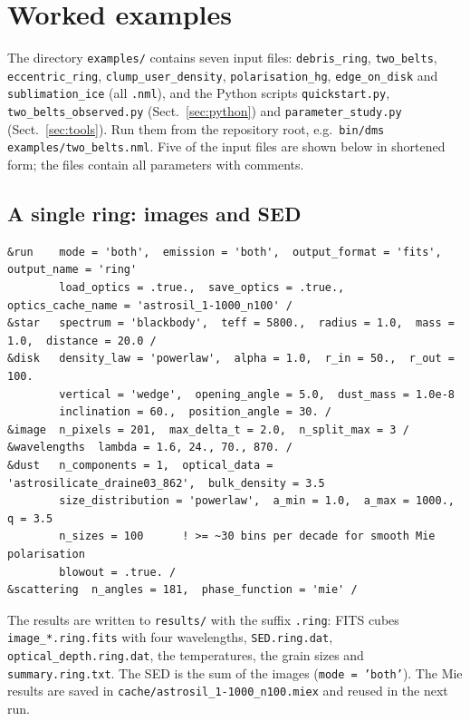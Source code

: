 \documentclass[11pt,a4paper]{article}
\newcommand{\code}[1]{\texttt{#1}}
\begin{document}
\section{Worked examples}
\label{sec:examples}

The directory \code{examples/} contains seven input files: \code{debris\_ring}, \code{two\_belts},
\code{eccentric\_ring}, \code{clump\_user\_density}, \code{polarisation\_hg}, \code{edge\_on\_disk}
and \code{sublimation\_ice} (all \code{.nml}), and the Python scripts \code{quickstart.py},
\code{two\_belts\_observed.py} (Sect.~\ref{sec:python}) and \code{parameter\_study.py}
(Sect.~\ref{sec:tools}). Run them from the repository root, e.g.\
\code{bin/dms examples/two\_belts.nml}. Five of the input files are shown below in shortened form; the files
contain all parameters with comments.

\subsection{A single ring: images and SED}

\begin{lstlisting}[style=nml]
&run    mode = 'both',  emission = 'both',  output_format = 'fits',  output_name = 'ring'
        load_optics = .true.,  save_optics = .true.,  optics_cache_name = 'astrosil_1-1000_n100' /
&star   spectrum = 'blackbody',  teff = 5800.,  radius = 1.0,  mass = 1.0,  distance = 20.0 /
&disk   density_law = 'powerlaw',  alpha = 1.0,  r_in = 50.,  r_out = 100.
        vertical = 'wedge',  opening_angle = 5.0,  dust_mass = 1.0e-8
        inclination = 60.,  position_angle = 30. /
&image  n_pixels = 201,  max_delta_t = 2.0,  n_split_max = 3 /
&wavelengths  lambda = 1.6, 24., 70., 870. /
&dust   n_components = 1,  optical_data = 'astrosilicate_draine03_862',  bulk_density = 3.5
        size_distribution = 'powerlaw',  a_min = 1.0,  a_max = 1000.,  q = 3.5
        n_sizes = 100      ! >= ~30 bins per decade for smooth Mie polarisation
        blowout = .true. /
&scattering  n_angles = 181,  phase_function = 'mie' /
\end{lstlisting}
The results are written to \code{results/} with the suffix \code{.ring}: FITS cubes
\code{image\_*.ring.fits} with four wavelengths, \code{SED.ring.dat}, \code{optical\_depth.ring.dat},
the temperatures, the grain sizes and \code{summary.ring.txt}. The SED is the sum of the images
(\code{mode = 'both'}). The Mie results are saved in \code{cache/astrosil\_1-1000\_n100.miex}
and reused in the next run.
\end{document}

